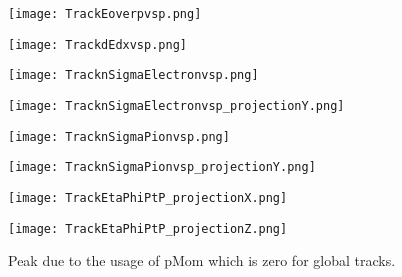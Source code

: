 \documentclass{beamer}
\begin{document}
\begin{frame}
  \begin{figure}[h!]
  \centering
  \texttt{[image: TrackEoverpvsp.png]}
  \end{figure}
\end{frame}

\begin{frame}
  \begin{figure}[h!]
  \centering
  \texttt{[image: TrackdEdxvsp.png]}
  \end{figure}
\end{frame}

\begin{frame}
  \begin{figure}[h!]
  \centering
  \texttt{[image: TracknSigmaElectronvsp.png]}
  \end{figure}
\end{frame}

\begin{frame}
  \begin{figure}[h!]
  \centering
  \texttt{[image: TracknSigmaElectronvsp\_projectionY.png]}
  \end{figure}
\end{frame}

\begin{frame}
  \begin{figure}[h!]
  \centering
  \texttt{[image: TracknSigmaPionvsp.png]}
  \end{figure}
\end{frame}

\begin{frame}
  \begin{figure}[h!]
  \centering
  \texttt{[image: TracknSigmaPionvsp\_projectionY.png]}
  \end{figure}
\end{frame}

\begin{frame}
  \begin{figure}[h!]
  \centering
  \texttt{[image: TrackEtaPhiPtP\_projectionX.png]}
  \end{figure}
\end{frame}

\begin{frame}
  \begin{figure}[h!]
  \centering
  \texttt{[image: TrackEtaPhiPtP\_projectionZ.png]}
  \caption{Peak due to the usage of pMom which is zero for global tracks.}
  \end{figure}
\end{frame}
\end{document}
